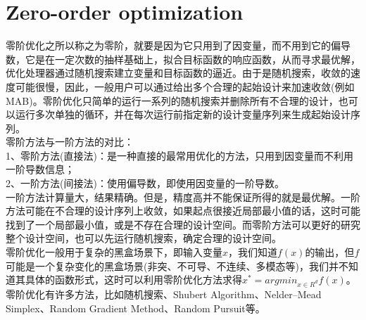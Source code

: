\section{Zero-order optimization}
零阶优化之所以称之为零阶，就要是因为它只用到了因变量，而不用到它的偏导数，它是在一定次数的抽样基础上，拟合目标函数的响应函数，从而寻求最优解，优化处理器通过随机搜索建立变量和目标函数的逼近。由于是随机搜索，收敛的速度可能很慢，因此，一般用户可以通过给出多个合理的起始设计来加速收敛(例如MAB)。零阶优化只简单的运行一系列的随机搜索并删除所有不合理的设计，也可以运行多次单独的循环，并在每次运行前指定新的设计变量序列来生成起始设计序列。\\
零阶方法与一阶方法的对比： \\
1、零阶方法(直接法)：是一种直接的最常用优化的方法，只用到因变量而不利用一阶导数信息；\\
2、一阶方法(间接法)：使用偏导数，即使用因变量的一阶导数。\\
一阶方法计算量大，结果精确。但是，精度高并不能保证所得的就是最优解。一阶方法可能在不合理的设计序列上收敛，如果起点很接近局部最小值的话，这时可能找到了一个局部最小值，或是不存在合理的设计空间。而零阶方法可以更好的研究整个设计空间，也可以先运行随机搜索，确定合理的设计空间。\\
零阶优化一般用于复杂的黑盒场景下，即输入变量$x$，我们知道$f(x)$的输出，但$f$可能是一个复杂变化的黑盒场景(非突、不可导、不连续、多模态等)，我们并不知道其具体的函数形式，这时可以利用零阶优化方法求得$x^* = argmin_{x\in R^d}f(x)$。零阶优化有许多方法，比如随机搜索、Shubert Algorithm\cite{mab1}、Nelder–Mead Simplex\cite{mab2}、Random Gradient Method\cite{mab3}、Random Pursuit\cite{mab4}等。
